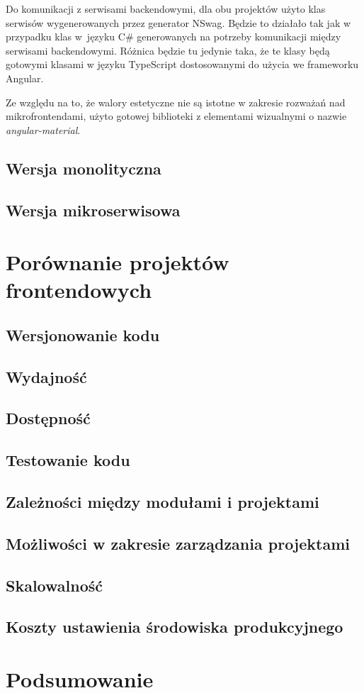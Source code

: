 \documentclass{SGGW-thesis}
\begin{document}
  Do komunikacji z serwisami backendowymi, dla obu projektów użyto klas serwisów wygenerowanych przez generator NSwag. Będzie to działało tak jak w przypadku klas w~języku C\# generowanych na potrzeby komunikacji między serwisami backendowymi. Różnica będzie tu jedynie taka, że te klasy będą gotowymi klasami w języku TypeScript dostosowanymi do użycia we frameworku Angular.

  Ze względu na to, że walory estetyczne nie są istotne w zakresie rozważań nad mikrofrontendami, użyto gotowej biblioteki z elementami wizualnymi o nazwie \textit{angular-material}. 

  \section{Wersja monolityczna}
  \section{Wersja mikroserwisowa}

\chapter{Porównanie projektów frontendowych}
  \section{Wersjonowanie kodu}
  \section{Wydajność}
  \section{Dostępność}
  \section{Testowanie kodu}
  \section{Zależności między modułami i projektami}
  \section{Możliwości w zakresie zarządzania projektami}
  \section{Skalowalność}
  \section{Koszty ustawienia środowiska produkcyjnego}

\chapter{Podsumowanie}

\nocite{*}
\printbibliography[heading=bibnumbered,title={Bibliografia}]

\beforelastpage
\end{document}
